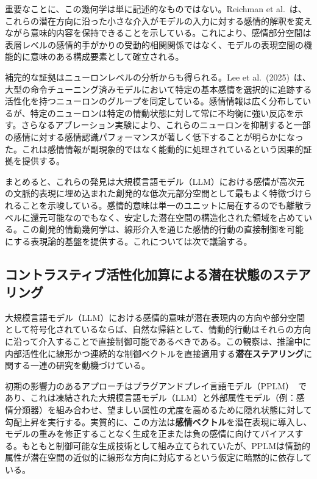 重要なことに、この幾何学は単に記述的なものではない。Reichman et al.~\cite{reichman2025emotionsartthouunderstanding}は、これらの潜在方向に沿った小さな介入がモデルの入力に対する感情的解釈を変えながら意味的内容を保持できることを示している。これにより、感情部分空間は表層レベルの感情的手がかりの受動的相関関係ではなく、モデルの表現空間の機能的に意味のある構成要素として確立される。

補完的な証拠はニューロンレベルの分析からも得られる。Lee et al.\ (2025)~\cite{lee-etal-2025-large}は、大型の命令チューニング済みモデルにおいて特定の基本感情を選択的に追跡する活性化を持つニューロンのグループを同定している。感情情報は広く分布しているが、特定のニューロンは特定の情動状態に対して常に不均衡に強い反応を示す。さらなるアブレーション実験により、これらのニューロンを抑制すると一部の感情に対する感情認識パフォーマンスが著しく低下することが明らかになった。これは感情情報が副現象的ではなく能動的に処理されているという因果的証拠を提供する。

まとめると、これらの発見は大規模言語モデル（LLM）における感情が高次元の文脈的表現に埋め込まれた創発的な低次元部分空間として最もよく特徴づけられることを示唆している。感情的意味は単一のユニットに局在するのでも離散ラベルに還元可能なのでもなく、安定した潜在空間の構造化された領域を占めている。この創発的情動幾何学は、線形介入を通じた感情的行動の直接制御を可能にする表現論的基盤を提供する。これについては次で議論する。

\subsection{コントラスティブ活性化加算による潜在状態のステアリング}

大規模言語モデル（LLM）における感情的意味が潜在表現内の方向や部分空間として符号化されているならば、自然な帰結として、情動的行動はそれらの方向に沿って介入することで直接制御可能であるべきである。この観察は、推論中に内部活性化に線形かつ連続的な制御ベクトルを直接適用する\textbf{潜在ステアリング}に関する一連の研究を動機づけている。

初期の影響力のあるアプローチはプラグアンドプレイ言語モデル（PPLM）~\cite{dathathri2020plugplaylanguagemodels}であり、これは凍結された大規模言語モデル（LLM）と外部属性モデル（例：感情分類器）を組み合わせ、望ましい属性の尤度を高めるために隠れ状態に対して勾配上昇を実行する。実質的に、この方法は\textbf{感情ベクトル}を潜在表現に導入し、モデルの重みを修正することなく生成を正または負の感情に向けてバイアスする。もともと制御可能な生成技術として組み立てられていたが、PPLMは情動的属性が潜在空間の近似的に線形な方向に対応するという仮定に暗黙的に依存している。

